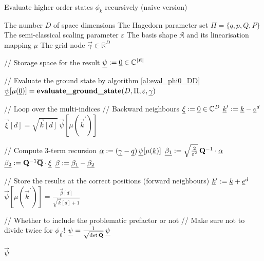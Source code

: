 \begin{algorithm}
  \caption{Evaluate higher order states $\phi_k$ recursively (naive version)}
  \label{al:eval_phik_DD_naive}
  \begin{algorithmic}
    \REQUIRE The number $D$ of space dimensions
    \REQUIRE The Hagedorn parameter set $\Pi = \{q,p,Q,P\}$
    \REQUIRE The semi-classical scaling parameter $\varepsilon$
    \REQUIRE The basis shape $\mathfrak{K}$ and its linearisation mapping $\mu$
    \REQUIRE The grid node $\vec{\gamma} \in \mathbb{R}^D$

    \STATE // Storage space for the result
    \STATE $\vec{\psi} \assign \vec{0} \in \mathbb{C}^{|\mathfrak{K}|}$

    \STATE // Evaluate the ground state by algorithm \ref{al:eval_phi0_DD}
    \STATE $\vec{\psi}[\mu(\vec{0})] = \text{\bf{evaluate\_ground\_state}}(D, \Pi, \varepsilon, \vec{\gamma})$

    \STATE // Loop over the multi-indices
      \STATE // Backward neighbours
      \STATE $\vec{\xi} \assign \vec{0} \in \mathbb{C}^{D}$
        \STATE $\vec{k}^\prime \assign \vec{k} - \vec{e}^{d}$
          \STATE $\vec{\xi}[d] = \sqrt{\vec{k}[d]} \, \vec{\psi}[\mu(\vec{k}^\prime)]$
        \ENDIF
      \ENDFOR

      \STATE // Compute 3-term recursion
      \STATE $\vec{\alpha} \assign (\vec{\gamma} - \vec{q}) \, \vec{\psi}[\mu(\vec{k})]$
      \STATE $\vec{\beta_1} \assign \sqrt{\frac{2}{\varepsilon^2}} \, \mat{Q}\inv \cdot \vec{\alpha}$
      \STATE $\vec{\beta_2} \assign \mat{Q}\inv \conj{\mat{Q}} \cdot \vec{\xi}$
      \STATE $\vec{\beta} \assign \vec{\beta_1} - \vec{\beta_2}$

      \STATE // Store the results at the correct positions (forward neighbours)
        \STATE $\vec{k}^\prime \assign \vec{k} + \vec{e}^d$
          \STATE $\vec{\psi}[\mu(\vec{k}^\prime)] = \frac{\vec{\beta}[d]}{\sqrt{\vec{k}[d] + 1}}$
        \ENDIF
      \ENDFOR
  \ENDFOR

  \STATE // Whether to include the problematic prefactor or not
  \STATE // Make sure not to divide twice for $\phi_{\vec{0}}$!
    \STATE $\vec{\psi} = \frac{1}{\sqrt{\det\mat{Q}}} \, \vec{\psi}$
  \ENDIF

  \RETURN $\vec{\psi}$
\end{algorithmic}
\end{algorithm}

